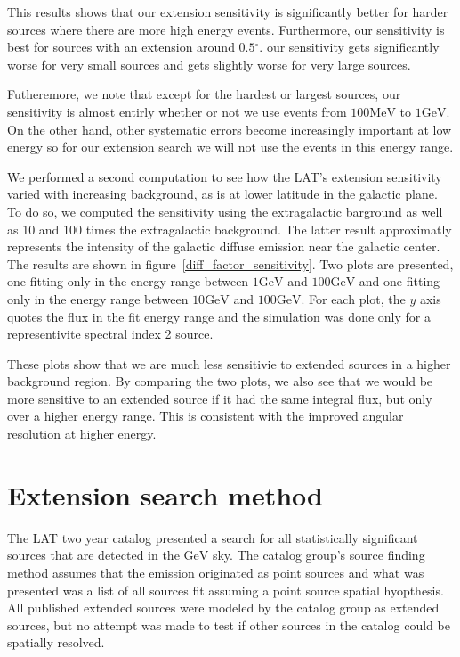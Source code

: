\documentclass[preprint]{aastex}
\newcommand{\mev}{\text{MeV}\xspace}
\newcommand{\gev}{\text{GeV}\xspace}
\renewcommand{\deg}{\ensuremath{^\circ}\xspace}
\begin{document}
This results shows that our extension sensitivity is
significantly better for harder sources where there are more high
energy events. Furthermore, our sensitivity is best for sources with an
extension around $0.5\deg$.  our sensitivity gets significantly worse
for very small sources and gets slightly worse for very large sources.

Futheremore, we note that except for the hardest or largest sources,
our sensitivity is almost entirly whether or not we use events from
$100\mev$ to $1\gev$. On the other hand, other systematic errors become
increasingly important at low energy so for our extension search we will
not use the events in this energy range.

We performed a second computation to see how the LAT's extension
sensitivity varied with increasing background, as is at lower latitude
in the galactic plane. To do so, we computed the sensitivity using the
extragalactic barground as well as 10 and 100 times the extragalactic
background. The latter result approximatly represents the intensity of
the galactic diffuse emission near the galactic center. The results are
shown in figure~\ref{diff_factor_sensitivity}. Two plots are presented,
one fitting only in the energy range between $1\gev$ and $100\gev$ and
one fitting only in the energy range between $10\gev$ and $100\gev$. For
each plot, the $y$ axis quotes the flux in the fit energy range and the
simulation was done only for a representivite spectral index 2 source.

These plots show that we are much less sensitivie to extended sources in
a higher background region. By comparing the two plots, we also see that
we would be more sensitive to an extended source if it had the same
integral flux, but only over a higher energy range. This is 
consistent with the improved angular resolution at higher energy.

\section{Extension search method}

The LAT two year catalog presented a search for all
statistically significant sources that are detected in the $\gev$
sky\cite{2FGL_catalog}.  The catalog group's source finding method assumes
that the emission originated as point sources and what was presented was
a list of all sources fit assuming a point source spatial hyopthesis. All
published extended sources were modeled by the catalog group as extended
sources, but no attempt was made to test if other sources in the catalog
could be spatially resolved.
\end{document}
